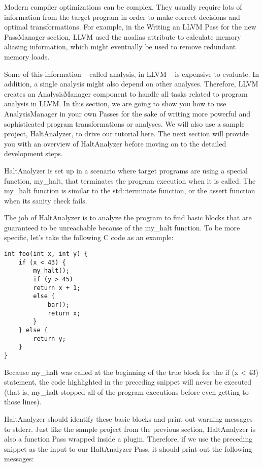 
Modern compiler optimizations can be complex. They usually require lots of information from the target program in order to make correct decisions and optimal transformations. For example, in the Writing an LLVM Pass for the new PassManager section, LLVM used the noalias attribute to calculate memory aliasing information, which might eventually be used to remove redundant memory loads.

Some of this information – called analysis, in LLVM – is expensive to evaluate. In addition, a single analysis might also depend on other analyses. Therefore, LLVM creates an AnalysisManager component to handle all tasks related to program analysis in LLVM. In this section, we are going to show you how to use AnalysisManager in your own Passes for the sake of writing more powerful and sophisticated program transformations or analyses. We will also use a sample project, HaltAnalyzer, to drive our tutorial here. The next section will provide you with an overview of HaltAnalyzer before moving on to the detailed development steps.


HaltAnalyzer is set up in a scenario where target programs are using a special function, my\_halt, that terminates the program execution when it is called. The my\_halt function is similar to the std::terminate function, or the assert function when its sanity check fails. 

The job of HaltAnalyzer is to analyze the program to find basic blocks that are guaranteed to be unreachable because of the my\_halt function. To be more specific, let's take the following C code as an example:

\begin{lstlisting}[style=styleCXX]
int foo(int x, int y) {
	if (x < 43) {
		my_halt();
		if (y > 45)
		return x + 1;
		else {
			bar();
			return x;
		}
	} else {
		return y;
	}
}
\end{lstlisting}

Because my\_halt was called at the beginning of the true block for the if (x < 43) statement, the code highlighted in the preceding snippet will never be executed (that is, my\_halt stopped all of the program executions before even getting to those lines).

HaltAnalyzer should identify these basic blocks and print out warning messages to stderr. Just like the sample project from the previous section, HaltAnalyzer is also a function Pass wrapped inside a plugin. Therefore, if we use the preceding snippet as the input to our HaltAnalyzer Pass, it should print out the following messages:

